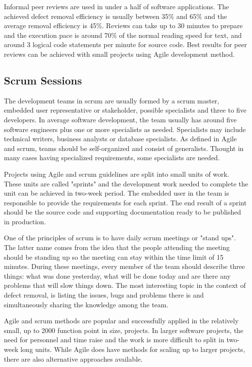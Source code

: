 Informal peer reviews are used in under a half of software applications. The achieved defect removal efficiency is usually between 35\% and 65\% and the average removal efficiency is 45\%. Reviews can take up to 30 minutes to prepare and the execution pace is around 70\% of the normal reading speed for text, and around 3 logical code statements per minute for source code. Best results for peer reviews can be achieved with small projects using Agile development method.

\subsection{Scrum Sessions} 
\label{subsec:scrumsessions}

The development teams in scrum are usually formed by a scrum master, embedded user representative or stakeholder, possible specialists and three to five developers. In average software development, the team usually has around five software engineers plus one or more specialists as needed. Specialists may include technical writers, business analysts or database specialists. As defined in Agile and scrum, teams should be self-organized and consist of generalists. Thought in many cases having specialized requirements, some specialists are needed.

Projects using Agile and scrum guidelines are split into small units of work. These units are called "sprints" and the development work needed to complete the unit can be achieved in two-week period. The embedded user in the team is responsible to provide the requirements for each sprint. The end result of a sprint should be the source code and supporting documentation ready to be published in production.

One of the principles of scrum is to have daily scrum meetings or "stand ups". The latter name comes from the idea that the people attending the meeting should be standing up so the meeting can stay within the time limit of 15 minutes. During these meetings, every member of the team should describe three things: what was done yesterday, what will be done today and are there any problems that will slow things down. The most interesting topic in the context of defect removal, is listing the issues, bugs and problems there is and simultaneously sharing the knowledge among the team.

Agile and scrum methods are popular and successfully applied in the relatively small, up to 2000 function point in size, projects. In larger software projects, the need for personnel and time raise and the work is more difficult to split in two-week long units. While Agile does have methods for scaling up to larger projects, there are also alternative approaches available.

